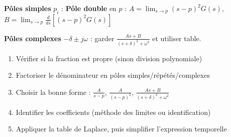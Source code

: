 \begin{tcolorbox}[colback=ch2orange!5,colframe=ch2orange!80!black,title={D\'ecomposition en fractions partielles}]
\textbf{P\^oles simples} $p_i$ :
\textbf{P\^ole double} en $p$ :
$A = \lim_{s\to p}(s{-}p)^2 G(s)$, \; $B = \lim_{s\to p}\frac{d}{ds}[(s{-}p)^2 G(s)]$

\textbf{P\^oles complexes} $-\delta \pm j\omega$ : garder $\frac{As+B}{(s{+}\delta)^2+\omega^2}$ et utiliser table.

\end{tcolorbox}

\begin{tcolorbox}[colback=ch2orange!5,colframe=ch2orange!80!black,title={Inversion de Laplace : recette d'examen}]
\begin{enumerate}
  \item V\'erifier si la fraction est propre (sinon division polynomiale)
  \item Factoriser le d\'enominateur en p\^oles simples/r\'ep\'et\'es/complexes
  \item Choisir la bonne forme : $\frac{A}{s-p}$, $\frac{A}{(s-p)^2}$, $\frac{As+B}{(s+\delta)^2+\omega^2}$
  \item Identifier les coefficients (m\'ethode des limites ou identification)
  \item Appliquer la table de Laplace, puis simplifier l'expression temporelle
\end{enumerate}
\end{tcolorbox}

